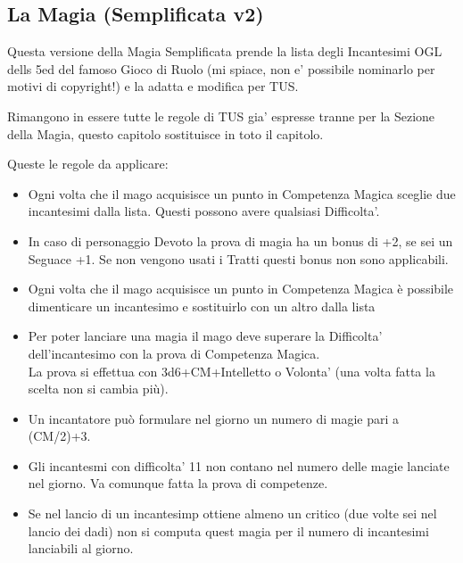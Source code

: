 \subsection{La Magia (Semplificata v2)}

\begin{multicols}{2}

Questa versione della Magia Semplificata prende la lista degli Incantesimi OGL dells 5ed del famoso Gioco di Ruolo (mi spiace, non e' possibile nominarlo per motivi di copyright!) e la adatta e modifica per TUS.




Rimangono in essere tutte le regole di TUS gia' espresse tranne per la Sezione della Magia, questo capitolo sostituisce in toto il capitolo.

Queste le regole da applicare:\\
\begin{itemize}

\item 
Ogni volta che il mago acquisisce un punto in Competenza Magica sceglie due incantesimi dalla lista. Questi possono avere qualsiasi Difficolta'.
\item 
In caso di personaggio Devoto la prova di magia ha un bonus di +2, se sei un Seguace +1.
Se non vengono usati i Tratti questi bonus non sono applicabili.
\item
Ogni volta che il mago acquisisce un punto in Competenza Magica è possibile dimenticare un incantesimo e sostituirlo con un altro dalla lista
\item 
Per poter lanciare una magia il mago deve superare la Difficolta' dell'incantesimo con la prova di Competenza Magica.\\
La prova si effettua con 3d6+CM+Intelletto o Volonta' (una volta fatta la scelta non si cambia più).
\item 
Un incantatore può formulare nel giorno un numero di magie pari a (CM/2)+3.
\item 
Gli incantesmi con difficolta' 11 non contano nel numero delle magie lanciate nel giorno. Va comunque fatta la prova di competenze.
\item
Se nel lancio di un incantesimp ottiene almeno un critico (due volte sei nel lancio dei dadi) non si computa quest magia per il numero di incantesimi lanciabili al giorno.
\end{itemize}


\end{multicols}
